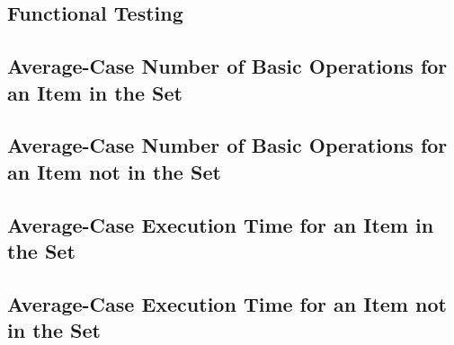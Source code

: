 \documentclass{article}
\begin{document}
    \subsection{Functional Testing}
    \subsection{Average-Case Number of Basic Operations for an Item in the Set}
    \subsection{Average-Case Number of Basic Operations for an Item not in the Set}
    \subsection{Average-Case Execution Time for an Item in the Set}
    \subsection{Average-Case Execution Time for an Item not in the Set}
\end{document}

